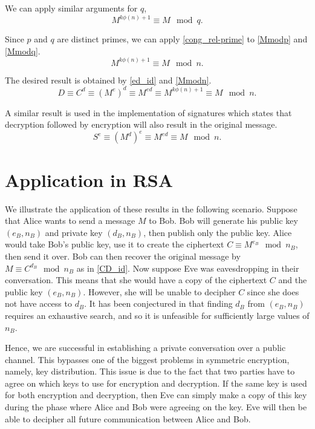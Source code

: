 \documentclass[10pt]{article}
\begin{document}
\noindent We can apply similar arguments for $q$,
\begin{equation}
    \label{Mmodq}
    M^{k \phi(n) + 1} \equiv M \mod q.
\end{equation}

\noindent Since $p$ and $q$ are distinct primes, we can apply \ref{cong_rel-prime} to \ref{Mmodp} and \ref{Mmodq}.
\begin{equation}
    \label{Mmodn}
    M^{k \phi(n) + 1} \equiv M \mod n.
\end{equation}

\noindent The desired result is obtained by \ref{ed_id} and \ref{Mmodn}.
\begin{equation}
    \label{CD_id}
    D \equiv C^d \equiv (M^e)^d  \equiv M^{e d} \equiv M^{k \phi(n) + 1} \equiv M \mod n.
\end{equation}

\noindent A similar result is used in the implementation of signatures which states that decryption followed by encryption will also result in the original message.
\begin{equation}
    \label{SE_id}
    S^e \equiv (M^d)^e \equiv M^{e d} \equiv M \mod n.
\end{equation}


\section{Application in RSA}
We illustrate the application of these results in the following scenario. Suppose that Alice wants to send a message $M$ to Bob. Bob will generate his public key $(e_B, n_B)$ and private key $(d_B, n_B)$, then publish only the public key. Alice would take Bob’s public key, use it to create the ciphertext $C \equiv M^{e_B} \mod n_B$, then send it over. Bob can then recover the original message by $M \equiv C^{d_B} \mod n_B$ as in \ref{CD_id}. Now suppose Eve was eavesdropping in their conversation. This means that she would have a copy of the ciphertext $C$ and the public key $(e_B, n_B)$. However, she will be unable to decipher $C$ since she does not have access to $d_B$. It has been conjectured in \cite{rivest1978method} that finding $d_B$ from $(e_B, n_B)$ requires an exhaustive search, and so it is unfeasible for sufficiently large values of $n_B$.

Hence, we are successful in establishing a private conversation over a public channel. This bypasses one of the biggest problems in symmetric encryption, namely, key distribution. This issue is due to the fact that two parties have to agree on which keys to use for encryption and decryption. If the same key is used for both encryption and decryption, then Eve can simply make a copy of this key during the phase where Alice and Bob were agreeing on the key. Eve will then be able to decipher all future communication between Alice and Bob.
\end{document}
